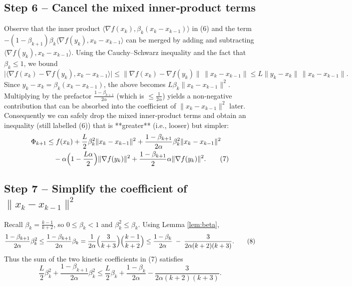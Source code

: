 \documentclass{article}
\begin{document}
\subsection*{Step 6 – Cancel the mixed inner‑product terms}
Observe that the inner product $\langle \nabla f(x_k),\beta_k (x_k-x_{k-1})\rangle$ in (6) and the term $- (1-\beta_{k+1})\beta_k\langle\nabla f(y_k),x_k-x_{k-1}\rangle$ can be merged by adding and subtracting $\langle\nabla f(y_k),x_k-x_{k-1}\rangle$.  Using the Cauchy–Schwarz inequality and the fact that $\beta_k\le 1$, we bound
\[
\big|\langle \nabla f(x_k)-\nabla f(y_k),x_k-x_{k-1}\rangle\big|
\le \|\nabla f(x_k)-\nabla f(y_k)\|\,\|x_k-x_{k-1}\|
\le L\|y_k-x_k\|\,\|x_k-x_{k-1}\|.
\]
Since $y_k-x_k=\beta_k (x_k-x_{k-1})$, the above becomes $L\beta_k\|x_k-x_{k-1}\|^{2}$.  Multiplying by the prefactor $ \frac{1-\beta_{k+1}}{2\alpha}$ (which is $ \le \frac{1}{2\alpha}$) yields a non‑negative contribution that can be absorbed into the coefficient of $\|x_k-x_{k-1}\|^{2}$ later.  Consequently we can safely drop the mixed inner‑product terms and obtain an inequality (still labelled (6)) that is **greater** (i.e., looser) but simpler:
\begin{align}
\Phi_{k+1}
&\le f(x_k) + \frac{L}{2}\beta_k^{2}\|x_k-x_{k-1}\|^{2}
+\frac{1-\beta_{k+1}}{2\alpha}\beta_k^{2}\|x_k-x_{k-1}\|^{2} \nonumber\\
&\quad -\alpha\Bigl(1-\frac{L\alpha}{2}\Bigr)\|\nabla f(y_k)\|^{2}
+ \frac{1-\beta_{k+1}}{2}\alpha\|\nabla f(y_k)\|^{2}.
\tag{7}
\end{align}

\subsection*{Step 7 – Simplify the coefficient of $\|x_k-x_{k-1}\|^{2}$}
Recall $\beta_k=\frac{k-1}{k+2}$, so $0\le\beta_k<1$ and $\beta_k^{2}\le\beta_k$.  Using Lemma \ref{lem:beta},
\[
\frac{1-\beta_{k+1}}{2\alpha}\beta_k^{2}
\le\frac{1-\beta_{k+1}}{2\alpha}\beta_k
= \frac{1}{2\alpha}\Bigl(\frac{3}{k+3}\Bigr)\Bigl(\frac{k-1}{k+2}\Bigr)
\le \frac{1-\beta_k}{2\alpha}\;-\;\frac{3}{2\alpha(k+2)(k+3)}.
\tag{8}
\]
Thus the sum of the two kinetic coefficients in (7) satisfies
\[
\frac{L}{2}\beta_k^{2}
+\frac{1-\beta_{k+1}}{2\alpha}\beta_k^{2}
\le \frac{L}{2}\beta_k
+\frac{1-\beta_k}{2\alpha}
-\frac{3}{2\alpha(k+2)(k+3)}.
\tag{9}
\]
\end{document}
